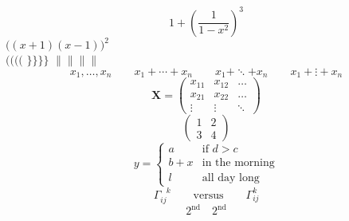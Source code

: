 \documentclass{book}
\begin{document}
\begin{displaymath}
1 + \left( \frac{1}{ 1-x^{2} }
\right) ^3
\end{displaymath}
$\Big( (x+1) (x-1) \Big) ^{2}$\\
$\big(\Big(\bigg(\Bigg($\quad
$\big\}\Big\}\bigg\}\Bigg\}$
\quad
$\big\|\Big\|\bigg\|\Bigg\|$
\begin{displaymath}
x_{1},\ldots,x_{n} \qquad
x_{1}+\cdots+x_{n}\qquad
x_{1}+\ddots+x_{n}\qquad
x_{1}+\vdots+x_{n}
\end{displaymath}
\begin{displaymath}
\mathbf{X} =
\left( \begin{array}{ccc}
x_{11} & x_{12} & \ldots \\
x_{21} & x_{22} & \ldots \\
\vdots & \vdots & \ddots
\end{array} \right)
\end{displaymath}
\begin{displaymath}
\left(\begin{array}{c|c}
1 & 2 \\
\hline
3 & 4
\end{array}\right)
\end{displaymath}
\begin{displaymath}
y = \left\{ \begin{array}{ll}
a & \textrm{if $d>c$}\\
b+x & \textrm{in the morning}\\
l & \textrm{all day long}
\end{array} \right.
\end{displaymath}
\begin{displaymath} 
\Gamma_{ij}^{\phantom{ij}k} 
\qquad \textrm{versus} \qquad 
\Gamma_{ij}^{k} 
\end{displaymath} 
\begin{equation}
2^{\textrm{nd}} \quad
2^{\mathrm{nd}}
\end{equation}
\end{document}
